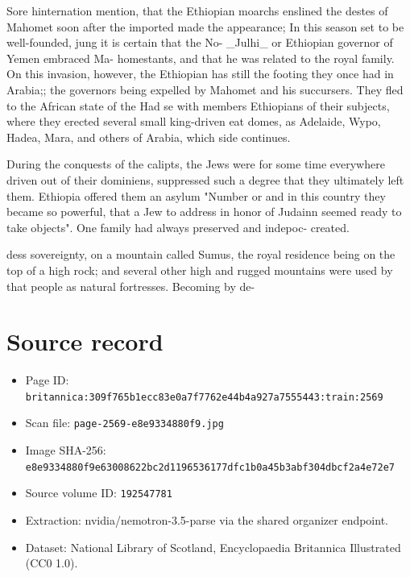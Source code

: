 \documentclass{article}
\begin{document}
Sore hinternation mention, that the Ethiopian moarchs enslined the destes of Mahomet soon after the imported made the appearance; In this season set to be well-founded, jung it is certain that the No- \_Julhi\_ or Ethiopian governor of Yemen embraced Ma- homestants, and that he was related to the royal family. On this invasion, however, the Ethiopian has still the footing they once had in Arabia;; the governors being expelled by Mahomet and his succursers. They fled to the African state of the Had se with members Ethiopians of their subjects, where they erected several small king-driven eat domes, as Adelaide, Wypo, Hadea, Mara, and others of Arabia, which side continues.

During the conquests of the calipts, the Jews were for some time everywhere driven out of their dominiens, suppressed such a degree that they ultimately left them. Ethiopia offered them an asylum "Number or and in this country they became so powerful, that a Jew to address in honor of Judainn seemed ready to take objects". One family had always preserved and indepoc- created.

dess sovereignty, on a mountain called Sumus, the royal residence being on the top of a high rock; and several other high and rugged mountains were used by that people as natural fortresses. Becoming by de-

\section*{Source record}
\begin{itemize}
\item Page ID: \texttt{britannica:309f765b1ecc83e0a7f7762e44b4a927a7555443:train:2569}
\item Scan file: \texttt{page-2569-e8e9334880f9.jpg}
\item Image SHA-256: \texttt{e8e9334880f9e63008622bc2d1196536177dfc1b0a45b3abf304dbcf2a4e72e7}
\item Source volume ID: \texttt{192547781}
\item Extraction: nvidia/nemotron-3.5-parse via the shared organizer endpoint.
\item Dataset: National Library of Scotland, Encyclopaedia Britannica Illustrated (CC0 1.0).
\end{itemize}
\end{document}
